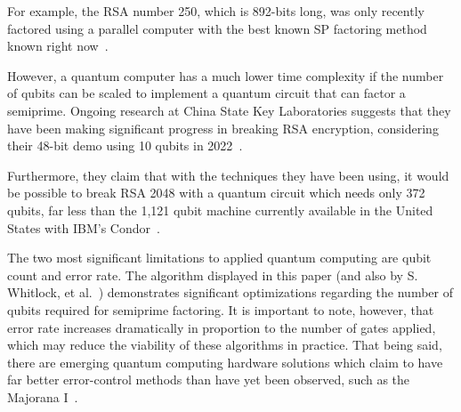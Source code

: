 \documentclass[twocolumn]{cinc}
\begin{document}


  

  For example, the RSA number 250, which is 892-bits long, was only recently 
  factored using a parallel computer with the best known SP factoring 
  method known right now~\cite{Bai2016}.


  However, a quantum computer has a much lower time complexity if the number of qubits
  can be scaled to implement a quantum circuit that can factor a semiprime. Ongoing research
  at China State Key Laboratories suggests that they have been making significant
  progress in breaking RSA encryption, considering their 48-bit demo using 10 qubits
  in 2022~\cite{yan2022factoringintegerssublinearresources}. 
  
  Furthermore, they claim
  that with the techniques they have been using, it would be possible to break
  RSA 2048 with a quantum circuit which needs only 372 qubits, far less than the
  1,121 qubit machine currently available in the United 
  States with IBM's Condor~\cite{abughanem2024ibmquantumcomputersevolution}.


  The two most significant limitations to applied quantum computing are 
  qubit count and error rate. The algorithm displayed in this paper (and also by
  S. Whitlock, et al.~\cite{quantum_factoring}) demonstrates
  significant optimizations regarding the number of qubits required for semiprime
  factoring. It is important to note, however, that error rate increases dramatically
  in proportion to the number of gates applied, which may reduce the viability of
  these algorithms in practice. That being said, there are emerging quantum computing 
  hardware solutions which claim to have far better error-control methods than have yet
  been observed, such as the Majorana I~\cite{Aghaee2025}.
\end{document}
